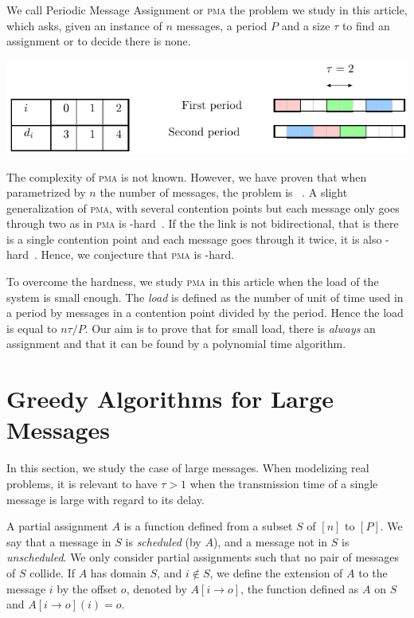 \documentclass[10pt, conference, letterpaper]{IEEEtran}
\newcommand\pma{\textsc{pma}\xspace}
\begin{document}
We call Periodic Message Assignment or \pma the problem we study in this article,
which asks, given an instance of $n$ messages, a period $P$ and a size $\tau$ to find 
an assignment or to decide there is none.
\begin{center}
\includegraphics[scale=0.7]{instance}
\end{center}
The complexity of \pma is not known. However, we have proven that when parametrized by
$n$ the number of messages, the problem is \FPT~\cite{barth2018deterministic}.
A slight generalization of \pma, with several contention points but each message only goes through two as in \pma is \NP-hard~\cite{barth2018deterministic}. If the the link is not bidirectional, that is there is a single contention point and each message goes through it twice, it is also \NP-hard~\cite{}. Hence, we conjecture that \pma is \NP-hard.

To overcome the hardness, we study \pma in this article when the load of the system is small enough. The \emph{load} is defined as the number of unit of time used in a period by messages in a contention point divided by the period. Hence the load is equal to $n\tau /P$.
Our aim is to prove that for small load, there is \emph{always} an assignment and that it can be found by a polynomial time algorithm.


\section{Greedy Algorithms for Large Messages}

In this section, we study the case of large messages. When modelizing real problems,
it is relevant to have $\tau > 1$ when the transmission time of a single message is large with regard to its delay.


A partial assignment $A$ is a function defined from a subset $S$ of $[n]$ to $[P]$.
We say that a message in $S$ is \emph{scheduled} (by $A$), and a message not in $S$ is \emph{unscheduled}. We only consider partial assignments such that no pair of messages of $S$ collide. If $A$ has domain $S$, and $i \notin S$, we define the extension of $A$ to the message $i$ by the offset $o$, denoted by $A[i \rightarrow o]$, the function defined as $A$ on $S$ and $A[i \rightarrow o](i) = o$.
\end{document}
